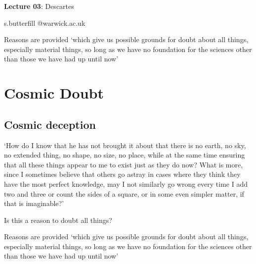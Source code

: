 \documentclass[12pt]{extarticle}
\date{}
\makeatletter
\def \ititle {Descartes}
\def \isubtitle {Lecture 02}
\def \iemail{s.butterfill @warwick.ac.uk}
\makeatother
\begin{document}
\begin{multicols*}{3}

\setlength\footnotesep{1em}









      
\def \ititle {Lecture 03}
 
\def \isubtitle {Descartes}
 
\begin{center}
 
{\Large
 
\textbf{\ititle}: \isubtitle
 
}
 
 
 
\iemail %
 
\end{center}
 
Reasons are provided ‘which give us possible grounds for doubt about all things, especially material things,  
so long as we have no foundation for the sciences other than those we have had up until now’
 
 
 
\section{Cosmic Doubt}
 
\subsection{Cosmic deception}
‘How do I know that he has not brought it about that there is no earth, 
no sky, no extended thing, no shape, no size, no place, while at the same 
time ensuring that all these things appear to me to exist just as they do now? 
What is more, since I sometimes believe that others go astray in cases 
where they think they have the most perfect knowledge, 
may I not similarly go wrong every time I add two and three or count the 
sides of a square, or in some even simpler matter, if that is imaginable?’
 
Is this a reason to doubt all things?
 
Reasons are provided ‘which give us possible grounds for doubt about all things, especially material things,  
so long as we have no foundation for the sciences other than those we have had up until now’
 

\end{multicols*}
\end{document}
